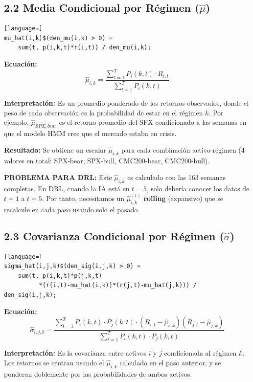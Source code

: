 \documentclass[11pt,a4paper]{article}
\begin{document}
\subsection{2.2 Media Condicional por Régimen ($\hat{\mu}$)}
\begin{lstlisting}[language=]
mu_hat(i,k)$(den_mu(i,k) > 0) =
    sum(t, p(i,k,t)*r(i,t)) / den_mu(i,k);
\end{lstlisting}

\textbf{Ecuación:}
\begin{equation}
    \hat{\mu}_{i,k} = \frac{\sum_{t=1}^{T} P_i(k,t) \cdot R_{i,t}}{\sum_{t=1}^{T} P_i(k,t)}
\end{equation}

\textbf{Interpretación:} Es un promedio ponderado de los retornos observados, donde el peso de cada observación es la probabilidad de estar en el régimen $k$. Por ejemplo, $\hat{\mu}_{SPX, bear}$ es el retorno promedio del SPX condicionado a las semanas en que el modelo HMM cree que el mercado estaba en crisis.

\textbf{Resultado:} Se obtiene un escalar $\hat{\mu}_{i,k}$ para cada combinación activo-régimen (4 valores en total: SPX-bear, SPX-bull, CMC200-bear, CMC200-bull).

\colorbox{yellow!30}{\parbox{0.9\textwidth}{
\textbf{PROBLEMA PARA DRL:} Este $\hat{\mu}_{i,k}$ es calculado con las 163 semanas completas. En DRL, cuando la IA está en $t=5$, solo debería conocer los datos de $t=1$ a $t=5$. Por tanto, necesitamos un $\hat{\mu}_{i,k}^{(t)}$ \textbf{rolling} (expansivo) que se recalcule en cada paso usando solo el pasado.
}}

\subsection{2.3 Covarianza Condicional por Régimen ($\hat{\sigma}$)}
\begin{lstlisting}[language=]
sigma_hat(i,j,k)$(den_sig(i,j,k) > 0) =
    sum(t, p(i,k,t)*p(j,k,t)
          *(r(i,t)-mu_hat(i,k))*(r(j,t)-mu_hat(j,k))) / den_sig(i,j,k);
\end{lstlisting}

\textbf{Ecuación:}
\begin{equation}
    \hat{\sigma}_{i,j,k} = \frac{\sum_{t=1}^{T} P_i(k,t) \cdot P_j(k,t) \cdot (R_{i,t} - \hat{\mu}_{i,k})(R_{j,t} - \hat{\mu}_{j,k})}{\sum_{t=1}^{T} P_i(k,t) \cdot P_j(k,t)}
\end{equation}

\textbf{Interpretación:} Es la covarianza entre activos $i$ y $j$ condicionada al régimen $k$. Los retornos se centran usando el $\hat{\mu}_{i,k}$ calculado en el paso anterior, y se ponderan doblemente por las probabilidades de ambos activos.
\end{document}
